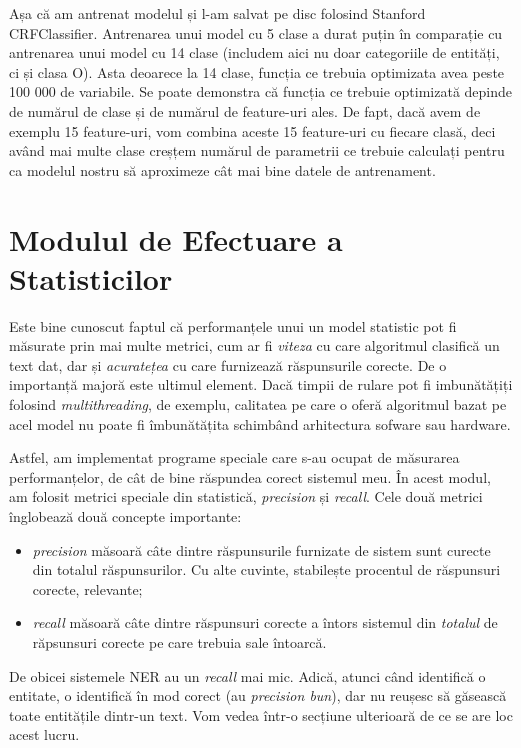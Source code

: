 Așa că am antrenat modelul și l-am salvat pe disc folosind Stanford CRFClassifier. Antrenarea unui model cu 5 clase a durat puțin în comparație cu antrenarea unui model cu 14 clase (includem aici nu doar categoriile de entități, ci și clasa O). Asta deoarece la 14 clase, funcția ce trebuia optimizata avea peste 100 000 de variabile. Se poate demonstra că funcția ce trebuie optimizată depinde de numărul de clase și de numărul de feature-uri ales. De fapt, dacă avem de exemplu 15 feature-uri, vom combina aceste 15 feature-uri  cu fiecare clasă, deci având mai multe clase creșțem numărul de parametrii ce trebuie calculați pentru ca modelul nostru să aproximeze cât mai bine datele de antrenament.


\section{Modulul de Efectuare a Statisticilor}

Este bine cunoscut faptul că performanțele unui un model statistic pot fi măsurate prin mai multe metrici, cum ar fi \textit{viteza} cu care algoritmul clasifică un text dat, dar și \textit{acuratețea} cu care furnizează răspunsurile corecte. De o importanță majoră este ultimul element. Dacă timpii de rulare pot fi imbunătățiți folosind \textit{multithreading}, de exemplu, calitatea pe care o oferă algoritmul bazat pe acel model nu poate fi îmbunătățita schimbând arhitectura sofware sau hardware.

Astfel, am implementat programe speciale care s-au ocupat de măsurarea performanțelor, de cât de bine răspundea corect sistemul meu. În acest modul, am folosit metrici speciale din statistică, \textit{precision} și \textit{recall}. Cele două metrici înglobează două concepte importante:

\begin{itemize}
\item \textit{precision} măsoară câte dintre răspunsurile furnizate de sistem sunt curecte din totalul răspunsurilor. Cu alte cuvinte, stabilește procentul de răspunsuri corecte, relevante;

\item \textit{recall} măsoară câte dintre răspunsuri corecte a întors sistemul din \textit{totalul} de răpsunsuri corecte pe care trebuia sale întoarcă.
\end{itemize}

De obicei sistemele NER au un \textit{recall} mai mic. Adică, atunci când identifică o entitate, o identifică în mod corect (au \textit{precision bun}), dar nu reușesc să găsească toate entitățile dintr-un text. Vom vedea într-o secțiune ulterioară de ce se are loc acest lucru.

